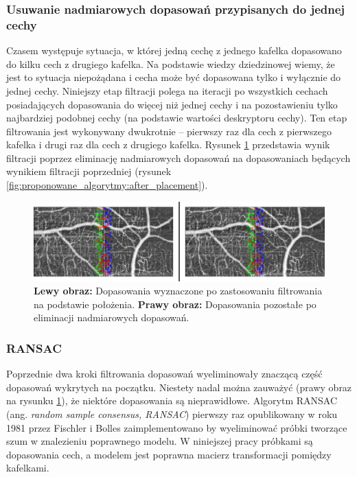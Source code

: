 \subsubsection{Usuwanie nadmiarowych dopasowań przypisanych do jednej cechy}
\label{sec:proponowane_algorytmy:no_repetition_filtering}

Czasem występuje sytuacja, w której jedną cechę z jednego kafelka dopasowano do kilku cech z drugiego kafelka. Na podstawie wiedzy dziedzinowej wiemy, że jest to sytuacja niepożądana i cecha może być dopasowana tylko i wyłącznie do jednej cechy. Niniejszy etap filtracji polega na iteracji po wszystkich cechach posiadających dopasowania do więcej niż jednej cechy i na pozostawieniu tylko najbardziej podobnej cechy (na podstawie wartości deskryptoru cechy). Ten etap filtrowania jest wykonywany dwukrotnie -- pierwszy raz dla cech z pierwszego kafelka i drugi raz dla cech z drugiego kafelka. Rysunek \ref{fig:proponowane_algorytmy:no_repetition_filtering} przedstawia wynik filtracji poprzez eliminację nadmiarowych dopasowań na dopasowaniach będących wynikiem filtracji poprzedniej (rysunek \ref{fig:proponowane_algorytmy:after_placement}).

\begin{figure}[H]
  \centering
  \includegraphics[width=\textwidth]{gfx/no_repetition_filtering}
  \caption{\textbf{Lewy obraz:} Dopasowania wyznaczone po zastosowaniu filtrowania na podstawie położenia. \textbf{Prawy obraz:} Dopasowania pozostałe po eliminacji nadmiarowych dopasowań.}
  \label{fig:proponowane_algorytmy:no_repetition_filtering}
\end{figure}

\subsubsection{RANSAC}
\label{sec:proponowane_algorytmy:ransac}

Poprzednie dwa kroki filtrowania dopasowań wyeliminowały znaczącą część dopasowań wykrytych na początku. Niestety nadal można zauważyć (prawy obraz na rysunku \ref{fig:proponowane_algorytmy:no_repetition_filtering}), że niektóre dopasowania są nieprawidłowe. Algorytm RANSAC (ang. \textit{random sample consensus, RANSAC}) pierwszy raz opublikowany w roku 1981 przez Fischler i Bolles \cite{Fischler:1981:RSC:358669.358692} zaimplementowano by wyeliminować próbki tworzące szum w znalezieniu poprawnego modelu. W niniejszej pracy próbkami są dopasowania cech, a modelem jest poprawna macierz transformacji pomiędzy kafelkami.

